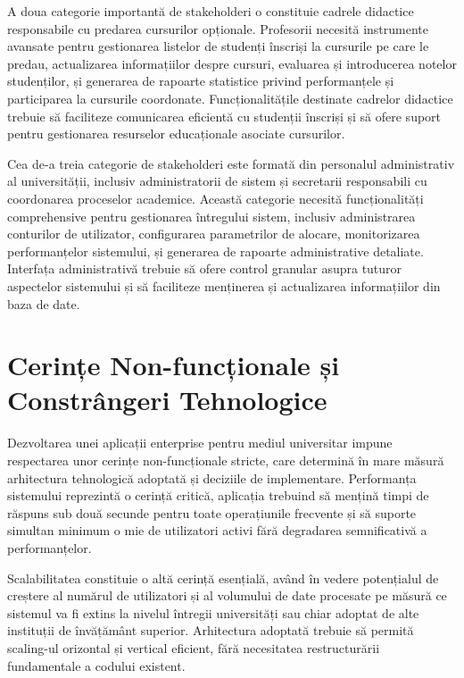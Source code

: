 \documentclass[12pt,a4paper]{report}
\begin{document}
A doua categorie importantă de stakeholderi o constituie cadrele didactice responsabile cu predarea cursurilor opționale. Profesorii necesită instrumente avansate pentru gestionarea listelor de studenți înscriși la cursurile pe care le predau, actualizarea informațiilor despre cursuri, evaluarea și introducerea notelor studenților, și generarea de rapoarte statistice privind performanțele și participarea la cursurile coordonate. Funcționalitățile destinate cadrelor didactice trebuie să faciliteze comunicarea eficientă cu studenții înscriși și să ofere suport pentru gestionarea resurselor educaționale asociate cursurilor.

Cea de-a treia categorie de stakeholderi este formată din personalul administrativ al universității, inclusiv administratorii de sistem și secretarii responsabili cu coordonarea proceselor academice. Această categorie necesită funcționalități comprehensive pentru gestionarea întregului sistem, inclusiv administrarea conturilor de utilizator, configurarea parametrilor de alocare, monitorizarea performanțelor sistemului, și generarea de rapoarte administrative detaliate. Interfața administrativă trebuie să ofere control granular asupra tuturor aspectelor sistemului și să faciliteze menținerea și actualizarea informațiilor din baza de date.

\section{Cerințe Non-funcționale și Constrângeri Tehnologice}

Dezvoltarea unei aplicații enterprise pentru mediul universitar impune respectarea unor cerințe non-funcționale stricte, care determină în mare măsură arhitectura tehnologică adoptată și deciziile de implementare. Performanța sistemului reprezintă o cerință critică, aplicația trebuind să mențină timpi de răspuns sub două secunde pentru toate operațiunile frecvente și să suporte simultan minimum o mie de utilizatori activi fără degradarea semnificativă a performanțelor.

Scalabilitatea constituie o altă cerință esențială, având în vedere potențialul de creștere al numărul de utilizatori și al volumului de date procesate pe măsură ce sistemul va fi extins la nivelul întregii universități sau chiar adoptat de alte instituții de învățământ superior. Arhitectura adoptată trebuie să permită scaling-ul orizontal și vertical eficient, fără necesitatea restructurării fundamentale a codului existent.
\end{document}
